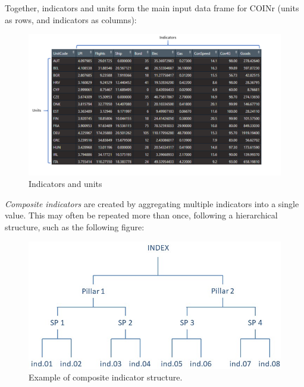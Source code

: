 \documentclass[
]{book}
\begin{document}
Together, indicators and units form the main input data frame for COINr (units as rows, and indicators as columns):

\begin{figure}

{\centering \includegraphics[width=1\linewidth]{images/inds_n_units} 

}

\caption{Indicators and units}\label{fig:unnamed-chunk-5}
\end{figure}

\emph{Composite indicators} are created by aggregating multiple indicators into a single value. This may often be repeated more than once, following a hierarchical structure, such as the following figure:

\begin{figure}

{\centering \includegraphics[width=1\linewidth]{images/CIhierarchy} 

}

\caption{Example of composite indicator structure.}\label{fig:unnamed-chunk-6}
\end{figure}
\end{document}
